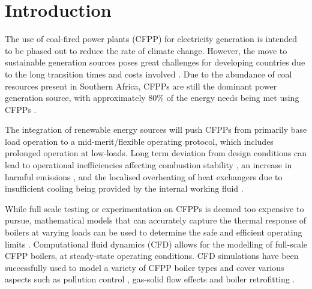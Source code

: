 \documentclass[11pt,cleanfoot]{asme2ej}
\begin{document}
\begin{nomenclature}
\begin{multicols}{2}
\end{multicols}
\end{nomenclature}
\section{Introduction}
The use of coal-fired power plants (CFPP) for electricity generation is intended to be phased out to reduce the rate of climate change. However, the move to sustainable generation sources poses great challenges for developing countries due to the long transition times and costs involved \cite{ugum2019}. Due to the abundance of coal resources present in Southern Africa, CFPPs are still the dominant power generation source, with approximately 80\% of the energy needs being met using CFPPs \cite{eskom}.

The integration of renewable energy sources will push CFPPs from primarily base load operation to a mid-merit/flexible operating protocol, which includes prolonged operation at low-loads. Long term deviation from design conditions can lead to operational inefficiencies affecting combustion stability \cite{Hernik2020}, an increase in harmful emissions \cite{Chang2021}, and the localised overheating of heat exchangers due to insufficient cooling being provided by the internal working fluid \cite{Modlinski2019}.

While full scale testing or experimentation on CFPPs is deemed too expensive to pursue, mathematical models that can accurately capture the thermal response of boilers at varying loads can be used to determine the safe and efficient operating limits \cite{Laubscher2019b}. Computational fluid dynamics (CFD) allows for the modelling of full-scale CFPP boilers, at steady-state operating conditions. CFD simulations have been successfully used to model a variety of CFPP boiler types \cite{Laubscher2019a, Gu2020} and cover various aspects such as pollution control \cite{Du2017, Fan2001}, gas-solid flow effects \cite{Chen2017} and boiler retrofitting \cite{Gu2020, He2007}.
\end{document}
